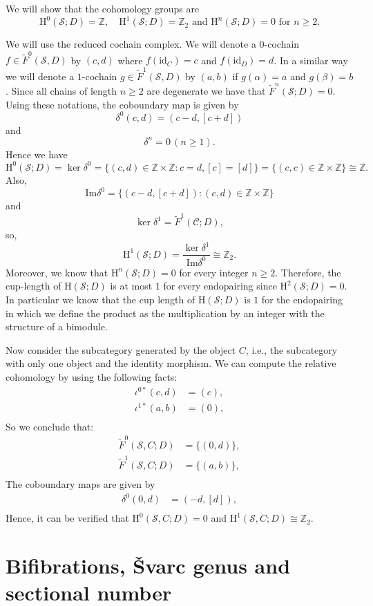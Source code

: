 \documentclass[12pt,reqno]{amsart}
\theoremstyle{definition}
\theoremstyle{remark}
\numberwithin{figure}{section}%
\newcommand{\CC}{\mathcal{C}}
\newcommand{\Si}{\mathcal{S}}
\newcommand{\Ho}{\mathrm{H}}
\newcommand{\id}{\mathrm{id}}
\newcommand{\Ima}{\mathrm{Im}}
\begin{document}
We will show that the cohomology groups are 
$$\Ho^0(\Si;D)=\mathbb{Z}, \quad \Ho^1(\Si;D)=\mathbb{Z}_2 \text{\ and\ } \Ho^n(\Si;D)=0 \text{\ for\ } n\geq 2.$$ 

We will use the reduced cochain complex. We will denote a $0$-cochain $f \in \tilde{F}^0(\Si,D)$ by $(c,d)$ where $f(\id_C)=c$ and $f(\id_D)=d$. In a similar way we will denote a $1$-cochain $g \in \tilde{F}^1(\Si,D)$ by $(a,b)$ if $g(\alpha)=a$ and $g(\beta)=b$. Since all chains of length $n\geq 2$ are degenerate we have that $\tilde{F}^n(\mathcal{S};D)=0$. Using these notations, the coboundary map is given by
    $$\delta^0(c,d)=(c-d,[c+d])$$
    and
    $$\delta^n=0 \, (n\geq 1).$$
    Hence we have  $$\Ho^0(\Si;D)=\ker \delta^0=\{(c,d) \in \mathbb{Z} \times \mathbb{Z} \colon c=d, [c]=[d]\}=\{(c,c)\in \mathbb{Z}  \times \mathbb{Z}\}\cong \mathbb{Z}.$$
    Also,
    $$\Ima \delta^0=\{(c-d,[c+d]) \colon (c,d) \in \mathbb{Z} \times \mathbb{Z}\} $$ and
    $$\ker\delta^1=\tilde{F}^1(\CC;D),$$
    so, $$\Ho^1(\Si;D)=\frac{\ker \delta^1}{\Ima \delta^0} \cong \mathbb{Z}_2.$$ 
Moreover, we know that $\Ho^n(\Si;D)=0$ for every integer $n\geq 2$.
Therefore, the cup-length of $\Ho(\Si;D)$ is at most $1$ for every endopairing since $\Ho^2(\Si;D)=0$. In particular we know that the cup length of $\Ho(\Si;D)$ is $1$ for the endopairing in which we define the product as the multiplication by an integer with the structure of a bimodule.

Now consider the subcategory generated by the object $C$, i.e., the subcategory with only one object and the identity morphism. We can compute the relative cohomology by using the following facts:
\begin{align*}
\iota^{0*}(c,d)&=(c),\\
 \iota^{1*}(a,b)&=(0),\\
\end{align*}
So we conclude that:
\begin{align*}
\tilde{F}^0(\Si, C ; D)&=\{(0,d)\},\\
\tilde{F}^1(\Si, C ; D)&=\{(a,b)\},\\
\end{align*}
The coboundary maps are given by
\begin{align*}
    \delta^0(0,d)&=(-d,[d]),\\
\end{align*}
Hence, it can be verified that $\Ho^0(\Si,C;D)=0$ and $\Ho^1(\Si,C;D)\cong \mathbb{Z}_2$. 
\section{Bifibrations, \v{S}varc genus and sectional number} \label{sec:bifibrations_Svarc}
\end{document}
